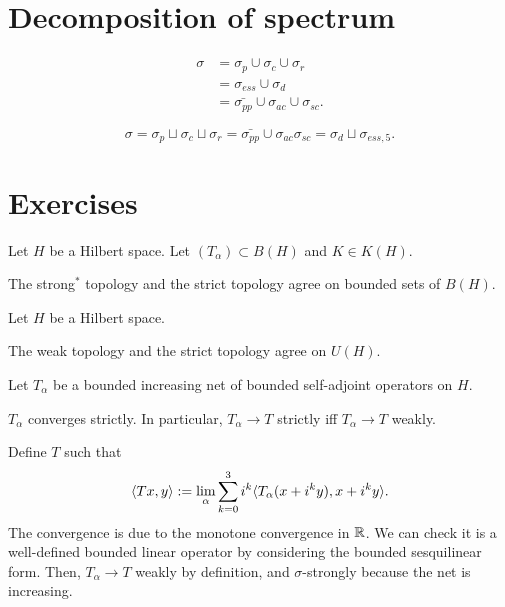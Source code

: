 \documentclass{../../large}
\begin{document}
\begin{prb}
\end{prb}




\section{Decomposition of spectrum}

\begin{align*}
\sigma
&=\sigma_p\cup\sigma_c\cup\sigma_r\\
&=\sigma_{ess}\cup\sigma_d\\
&=\bar{\sigma_{pp}}\cup\sigma_{ac}\cup\sigma_{sc}.
\end{align*}


\[\sigma=\sigma_p\sqcup\sigma_c\sqcup\sigma_r=\bar{\sigma_{pp}}\cup\sigma_{ac}\sigma_{sc}=\sigma_d\sqcup\sigma_{ess,5}.\]





\section*{Exercises}


\begin{prb}
Let $H$ be a Hilbert space.
Let $(T_\alpha)\subset B(H)$ and $K\in K(H)$.
\begin{parts}
\item The strong$^*$ topology and the strict topology agree on bounded sets of $B(H)$.
\end{parts}
\end{prb}

\begin{prb}
Let $H$ be a Hilbert space.
\begin{parts}
\item The weak topology and the strict topology agree on $U(H)$.
\end{parts}
\end{prb}


\begin{prb}
Let $T_\alpha$ be a bounded increasing net of bounded self-adjoint operators on $H$.
\begin{parts}
\item $T_\alpha$ converges strictly. In particular, $T_\alpha\to T$ strictly iff $T_\alpha\to T$ weakly.
\end{parts}
\end{prb}
\begin{pf}
Define $T$ such that
\[\langle Tx,y\rangle:=\lim_\alpha\sum_{k=0}^3i^k\langle T_\alpha(x+i^ky),x+i^ky\rangle.\]
The convergence is due to the monotone convergence in $\mathbb{R}$.
We can check it is a well-defined bounded linear operator by considering the bounded sesquilinear form.
Then, $T_\alpha\to T$ weakly by definition, and $\sigma$-strongly because the net is increasing.
\end{pf}
\end{document}

